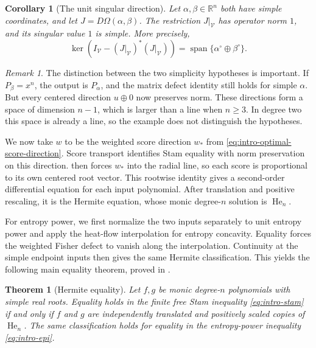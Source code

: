 \documentclass[12pt,reqno]{amsart}
\newtheorem{theorem}{Theorem}[section]
\newtheorem{corollary}[corollary]{Corollary}
\theoremstyle{definition}
\theoremstyle{remark}
\newtheorem{remark}[remark]{Remark}
\newcommand{\R}{\mathbb R}
\newcommand{\He}{\operatorname{He}}
\begin{document}
\begin{corollary}[The unit singular direction]
\label{cor:intro-jacobian-rigidity}
Let \(\alpha,\beta\in\R^n\) both have simple coordinates, and let
\(J=D\Omega(\alpha,\beta)\). The restriction \(J|_{\mathcal V}\)
has operator norm \(1\), and its singular value \(1\) is simple.
More precisely,
\begin{equation}\label{eq:intro-unit-singular-space}
 \ker\!\left(I_{\mathcal V}-(J|_{\mathcal V})^*(J|_{\mathcal V})\right)
       =\operatorname{span}\{\alpha^\circ\oplus\beta^\circ\}.
\end{equation}
\end{corollary}

\begin{remark}
\label{rem:intro-simplicity-obstruction}
The distinction between the two simplicity hypotheses is important.
If \(P_\beta=x^n\), the output is \(P_\alpha\), and the matrix
defect identity still holds for simple \(\alpha\).  But every
centered direction \(u\oplus0\) now preserves norm.  These directions
form a space of dimension \(n-1\), which is larger than a line when
\(n\geq3\).  In degree two this space is already a line, so the
example does not distinguish the hypotheses.
\end{remark}

We now take \(w\) to be the weighted score direction \(w_*\) from
\eqref{eq:intro-optimal-score-direction}.  Score transport identifies
Stam equality with norm preservation on this direction.
 then forces \(w_*\) into the radial
line, so each score is proportional to its own centered root vector.
This rootwise identity gives a second-order differential equation for
each input polynomial.  After translation and positive rescaling, it is
the Hermite equation, whose monic degree-\(n\) solution is \(\He_n\).

For entropy power, we first normalize the two inputs separately
to unit entropy power and apply the heat-flow interpolation for
entropy concavity. Equality forces the weighted Fisher defect to
vanish along the interpolation. Continuity at the simple endpoint
inputs then gives the same Hermite classification. This yields
the following main equality theorem, proved in
.

\begin{theorem}[Hermite equality]\label{thm:information-equality}
\label{thm:intro-stam-equality}\label{thm:intro-epi-equality}
Let \(f,g\) be monic degree-\(n\) polynomials with simple real roots.
Equality holds in the finite free Stam inequality
\eqref{eq:intro-stam} if and only if \(f\) and \(g\) are independently
translated and positively scaled copies of \(\He_n\).  The same
classification holds for equality in the entropy-power inequality
\eqref{eq:intro-epi}.
\end{theorem}
\end{document}
